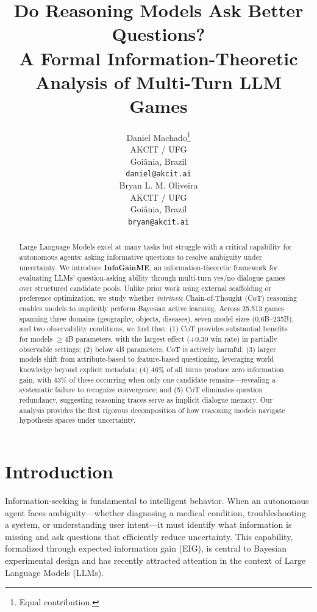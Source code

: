 \documentclass[11pt]{article}
\title{Do Reasoning Models Ask Better Questions?\\A Formal Information-Theoretic Analysis of Multi-Turn LLM Games}
\author{%
  Daniel Machado\thanks{Equal contribution.} \\
  AKCIT / UFG \\
  Goiânia, Brazil \\
  \texttt{daniel@akcit.ai} \\
  \And
  Bryan L. M. Oliveira\footnotemark[1] \\
  AKCIT / UFG \\
  Goiânia, Brazil \\
  \texttt{bryan@akcit.ai} \\
  \And
}
\begin{document}
\maketitle

\begin{abstract}
Large Language Models excel at many tasks but struggle with a critical capability for autonomous agents: asking informative questions to resolve ambiguity under uncertainty. We introduce \textbf{InfoGainME}, an information-theoretic framework for evaluating LLMs' question-asking ability through multi-turn yes/no dialogue games over structured candidate pools. Unlike prior work using external scaffolding or preference optimization, we study whether \emph{intrinsic} Chain-of-Thought (CoT) reasoning enables models to implicitly perform Bayesian active learning. Across 25,513 games spanning three domains (geography, objects, diseases), seven model sizes (0.6B--235B), and two observability conditions, we find that: (1) CoT provides substantial benefits for models $\geq$4B parameters, with the largest effect (+0.30 win rate) in partially observable settings; (2) below 4B parameters, CoT is actively harmful; (3) larger models shift from attribute-based to feature-based questioning, leveraging world knowledge beyond explicit metadata; (4) 46\% of all turns produce zero information gain, with 43\% of these occurring when only one candidate remains---revealing a systematic failure to recognize convergence; and (5) CoT eliminates question redundancy, suggesting reasoning traces serve as implicit dialogue memory. Our analysis provides the first rigorous decomposition of how reasoning models navigate hypothesis spaces under uncertainty.
\end{abstract}

\section{Introduction}
\label{sec:intro}

Information-seeking is fundamental to intelligent behavior. When an autonomous agent faces ambiguity---whether diagnosing a medical condition, troubleshooting a system, or understanding user intent---it must identify what information is missing and ask questions that efficiently reduce uncertainty. This capability, formalized through expected information gain (EIG), is central to Bayesian experimental design \citep{lindley1956measure,chaloner1995bayesian} and has recently attracted attention in the context of Large Language Models (LLMs).
\end{document}
